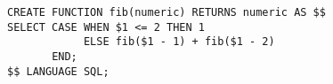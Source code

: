\begin{verbatim}
CREATE FUNCTION fib(numeric) RETURNS numeric AS $$
SELECT CASE WHEN $1 <= 2 THEN 1
            ELSE fib($1 - 1) + fib($1 - 2)
       END;
$$ LANGUAGE SQL;
\end{verbatim}